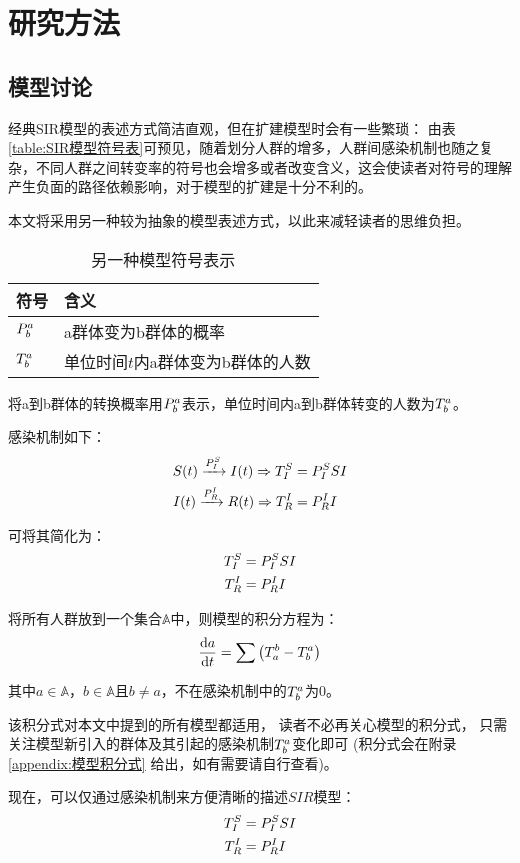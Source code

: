 \section{研究方法}
\subsection{模型讨论}
\par 经典SIR模型的表述方式简洁直观，但在扩建模型时会有一些繁琐：
由表\ref{table:SIR模型符号表}可预见，随着划分人群的增多，人群间感染机制也随之复杂，不同人群之间转变率的符号也会增多或者改变含义，这会使读者对符号的理解产生负面的路径依赖影响，对于模型的扩建是十分不利的。
\par 本文将采用另一种较为抽象的模型表述方式，以此来减轻读者的思维负担。
\begin{table}[H]
    \centering
    \caption{另一种模型符号表示}
    \begin{tabular}{ll}
        \hline
        符号       & 含义                              \\
        \hline
        $\P{a}{b}$ & a群体变为b群体的概率              \\
        $\T{a}{b}$ & 单位时间$t$内a群体变为b群体的人数 \\
        \hline
    \end{tabular}
\end{table}
\par 将a到b群体的转换概率用$\P{a}{b}$表示，单位时间内a到b群体转变的人数为$\T{a}{b}$。
\par 感染机制如下：
\begin{align}
    S(t)\xrightarrow{\P{S}{I}}I(t) \Rightarrow \TP{S}{I}{SI} \\
    I(t)\xrightarrow{\P{I}{R}}R(t) \Rightarrow \TP{I}{R}{I}
\end{align}
\par 可将其简化为：
\begin{align}
    \TP{S}{I}{SI} \\
    \TP{I}{R}{I}
\end{align}
\par 将所有人群放到一个集合$\mathbb{A}$中，则模型的积分方程为：
\begin{equation}
    \dt{a} = \sum\left(\T{b}{a}-\T{a}{b}\right)
\end{equation}
\par 其中$a\in\mathbb{A}$，$b\in\mathbb{A}$且$b\not=a$，不在感染机制中的$\T{a}{b}$为$0$。
\par 该积分式对本文中提到的所有模型都适用，
读者不必再关心模型的积分式，
只需关注模型新引入的群体及其引起的感染机制$\T{a}{b}$变化即可
(积分式会在附录\ref{appendix:模型积分式} 给出，如有需要请自行查看)。
\par 现在，可以仅通过感染机制来方便清晰的描述$SIR$模型：
\begin{align}
    \TP{S}{I}{SI} \\
    \TP{I}{R}{I}
\end{align}
